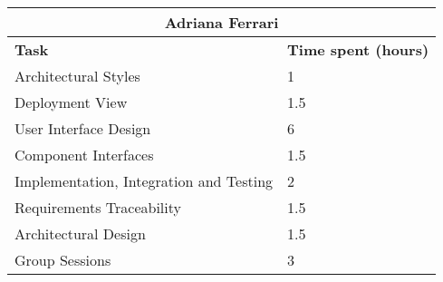 \begin{table}[H]
  \center
  \begin{tabular}{l|l}
    \multicolumn{2}{c}{\textbf{Adriana Ferrari}} \\
    \hline
    \textbf{Task} & \textbf{Time spent (hours)}\\
    \hline
    Architectural Styles & 1 \\
    Deployment View & 1.5 \\
    User Interface Design & 6 \\
    Component Interfaces & 1.5 \\ 
    Implementation, Integration and Testing & 2 \\
    Requirements Traceability & 1.5 \\
    Architectural Design & 1.5 \\
    Group Sessions & 3 \\
  \end{tabular}
\end{table}